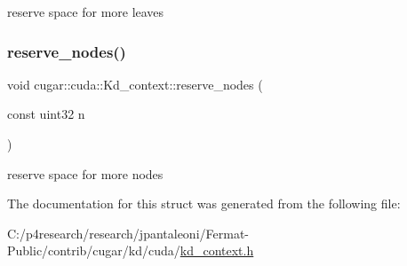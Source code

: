 reserve space for more leaves \mbox{\label{structcugar_1_1cuda_1_1_kd__context_a5c97fca7fe7ce898fdf17f7406d5efc8}} 
\subsubsection{\texorpdfstring{reserve\+\_\+nodes()}{reserve\_nodes()}}
{\footnotesize\ttfamily void cugar\+::cuda\+::\+Kd\+\_\+context\+::reserve\+\_\+nodes (\begin{DoxyParamCaption}\item[{const uint32}]{n }\end{DoxyParamCaption})\hspace{0.3cm}{\ttfamily [inline]}}

reserve space for more nodes 

The documentation for this struct was generated from the following file\+:\begin{DoxyCompactItemize}
\item 
C\+:/p4research/research/jpantaleoni/\+Fermat-\/\+Public/contrib/cugar/kd/cuda/\hyperlink{kd__context_8h}{kd\+\_\+context.\+h}\end{DoxyCompactItemize}
